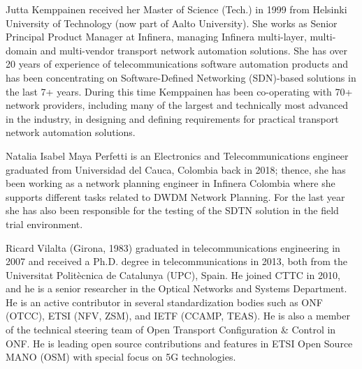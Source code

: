 \documentclass[10pt, conference]{IEEEtran}
\begin{document}
\begin{IEEEbiography}Jutta Kemppainen received her Master of Science (Tech.) in 1999 from Helsinki University of Technology (now part of Aalto University). She works as Senior Principal Product Manager at Infinera, managing Infinera multi-layer, multi-domain and multi-vendor transport network automation solutions. She has over 20 years of experience of telecommunications software automation products and has been concentrating on Software-Defined Networking (SDN)-based solutions in the last 7+ years. During this time Kemppainen has been co-operating with 70+ network providers, including many of the largest and technically most advanced in the industry, in designing and defining requirements for practical transport network automation solutions.\end{IEEEbiography}

\begin{IEEEbiography}Natalia Isabel Maya Perfetti is an Electronics and Telecommunications engineer graduated from Universidad del Cauca, Colombia back in 2018; thence, she has been working as a network planning engineer in Infinera Colombia where she supports different tasks related to DWDM Network Planning. For the last year she has also been responsible for the testing of the SDTN solution in the field trial environment.\end{IEEEbiography}

\begin{IEEEbiography}Ricard Vilalta (Girona, 1983) graduated in telecommunications engineering in 2007 and received a Ph.D. degree in telecommunications in 2013, both from the Universitat Politècnica de Catalunya (UPC), Spain. He joined CTTC in 2010, and he is a senior researcher in the Optical Networks and Systems Department. He is an active contributor in several standardization bodies such as ONF (OTCC), ETSI (NFV, ZSM), and IETF (CCAMP, TEAS). He is also a member of the technical steering team of Open Transport Configuration \& Control in ONF. He is leading open source contributions and features in ETSI Open Source MANO (OSM) with special focus on 5G technologies.\end{IEEEbiography}
\end{document}
